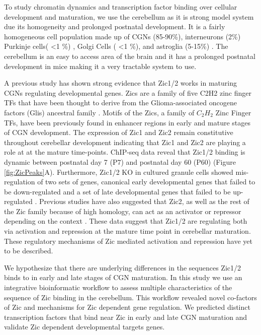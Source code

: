 \documentclass[fleqn,10pt,twocolumn]{wlscirep}
\begin{document}
To study chromatin dynamics and transcription factor binding over cellular development and maturation, we use the cerebellum as it is strong model system due its homogeneity and prolonged postnatal development.  It is a fairly homogeneous cell population made up of CGNs (85-90\%), interneurons (2\%) Purkinje cells( \textless 1 \%) , Golgi Cells ( \textless 1 \%), and astroglia (5-15\%) \cite{Frank2015RegulationCerebellum}. The cerebellum is an easy to access area of the brain and it has a prolonged postnatal development in mice making it a very tractable system to use\cite{Wang2001GeneticDevelopment}. 

A previous study has shown strong evidence that Zic1/2 works in maturing CGNs regulating developmental genes. Zics are a family of five C2H2 zinc finger TFs that have been thought to derive from the Glioma-associated oncogene factors (Glis) ancestral family \cite{Tohmonda2018IdentificationProteins, Ishiguro2018LinkExpression}. Motifs of the Zics, a family of $C_2H_2$ Zinc Finger TFs, have been previously found in enhancer regions in early and mature stages of CGN development. The expression of Zic1 and Zic2 remain constitutive throughout cerebellar development indicating that Zic1 and Zic2 are playing a role at at the mature time-points. ChIP-seq data reveal that Zic1/2 binding is dynamic between postnatal day 7 (P7) and postnatal day 60 (P60) (Figure \ref{fig:ZicPeaks}A). Furthermore, Zic1/2 KO in cultured granule cells showed mis-regulation of two sets of genes, canonical early developmental genes that failed to be down-regulated and a set of late developmental genes that failed to be up-regulated \cite{Frank2015RegulationCerebellum}. Previous studies have also suggested that Zic2, as well as the rest of the Zic family because of high homology, can act as an activator or repressor depending on the context \cite{Ishiguro2018LinkExpression, Himeda2013Pax3Enhancer, Luo2015Zic2Specification, Hatayama2018RoleRemodeling.}. These data suggest that Zic1/2 are regulating both via activation and repression at the mature time point in cerebellar maturation. These regulatory mechanisms of Zic mediated activation and repression have yet to be described.
 
We hypothesize that there are underlying differences in the sequences Zic1/2 binds to in early and late stages of CGN maturation. In this study we use an integrative bioinformatic workflow to assess multiple characteristics of the sequence of Zic binding in the cerebellum.  This workflow revealed novel co-factors of Zic and mechanisms for Zic dependent gene regulation. We predicted distinct transcription factors that bind near Zic in early and late CGN maturation and validate Zic dependent developmental targets genes.
\end{document}
